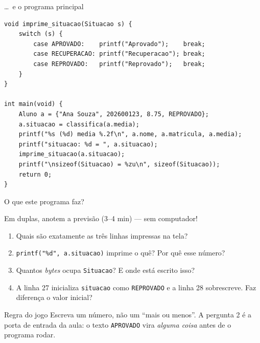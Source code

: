 \documentclass[aspectratio=169]{beamer}
\begin{document}
\begin{frame}[fragile]{\ldots\ e o programa principal}
\begin{lstlisting}[basicstyle=\ttfamily\scriptsize, firstnumber=18]
void imprime_situacao(Situacao s) {
    switch (s) {
        case APROVADO:    printf("Aprovado");    break;
        case RECUPERACAO: printf("Recuperacao"); break;
        case REPROVADO:   printf("Reprovado");   break;
    }
}

int main(void) {
    Aluno a = {"Ana Souza", 202600123, 8.75, REPROVADO};
    a.situacao = classifica(a.media);
    printf("%s (%d) media %.2f\n", a.nome, a.matricula, a.media);
    printf("situacao: %d = ", a.situacao);
    imprime_situacao(a.situacao);
    printf("\nsizeof(Situacao) = %zu\n", sizeof(Situacao));
    return 0;
}
\end{lstlisting}
\end{frame}

\begin{frame}{O que este programa faz?}
  \begin{block}{Em duplas, anotem a previsão (3--4 min) --- sem computador!}
    \begin{enumerate}
      \item Quais são exatamente as três linhas impressas na tela?
      \item \texttt{printf("\%d", a.situacao)} imprime o quê? Por quê esse número?
      \item Quantos \emph{bytes} ocupa \texttt{Situacao}? E onde está escrito isso?
      \item A linha 27 inicializa \texttt{situacao} como \texttt{REPROVADO} e a
        linha 28 sobrescreve. Faz diferença o valor inicial?
    \end{enumerate}
  \end{block}
  \begin{exampleblock}{Regra do jogo}
    Escreva um número, não um ``mais ou menos''. A pergunta 2 é a porta de
    entrada da aula: o texto \texttt{APROVADO} vira \emph{alguma coisa} antes de
    o programa rodar.
  \end{exampleblock}
\end{frame}
\end{document}
